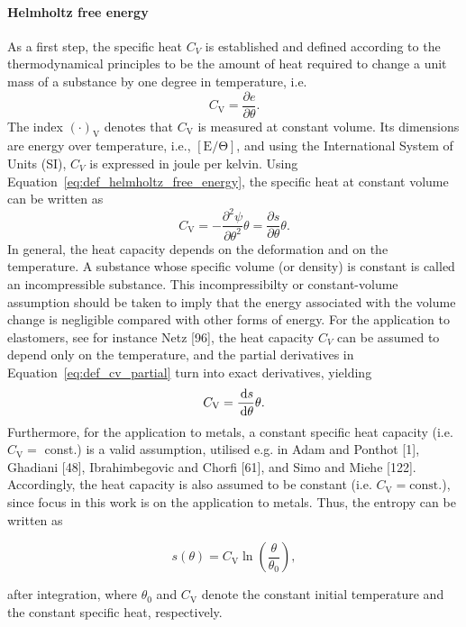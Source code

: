 \paragraph{Helmholtz free energy}
As a first step, the specific heat \(C_{V}\) is established and defined according to the thermodynamical principles to be the amount of heat required to change a unit mass of a substance by one degree in temperature, i.e.
\begin{equation}
C_{\mathrm{V}}=\frac{\partial e}{\partial \theta}.
\end{equation}
The index \((\cdot)_\mathrm{V}\) denotes that \(C_\mathrm{V}\) is measured at constant volume.
Its dimensions are energy over temperature, i.e., \(\mathrm{[E/\Theta]}\), and using the International System of Units (SI), \(C_{V}\) is expressed in joule per kelvin.
Using Equation~\ref{eq:def_helmholtz_free_energy}, the specific heat at constant volume can be written as
\begin{equation} \label{eq:def_cv_partial}
C_{\mathrm{V}}=-\frac{\partial^{2} \psi}{\partial \theta^{2}} \theta=\frac{\partial s}{\partial \theta} \theta.
\end{equation}
In general, the heat capacity depends on the deformation and on the temperature.
A substance whose specific volume (or density) is constant is called an incompressible substance.
This incompressibilty or constant-volume assumption should be taken to imply that the energy associated with the volume change is negligible compared with other forms of energy.
For the application to elastomers, see for instance Netz [96], the heat capacity \(C_{V}\) can be assumed to depend only on the temperature, and the partial derivatives in Equation~\eqref{eq:def_cv_partial} turn into exact derivatives, yielding
\begin{equation}
  C_\mathrm{V} = \frac{\,\mathrm{d} s}{\,\mathrm{d} \theta}\theta.
\end{equation}
Furthermore, for the application to metals, a constant specific heat capacity (i.e. \(C_{\mathrm{V}}=\) const.) is a valid assumption, utilised e.g. in Adam and Ponthot [1], Ghadiani [48], Ibrahimbegovic and Chorfi [61], and Simo and Miehe [122].
Accordingly, the heat capacity is also assumed to be constant (i.e. \(C_{\mathrm{V}}= \mathrm{const}\).), since focus in this work is on the application to metals.
Thus, the entropy can be written as
\begin{highlight}
\begin{equation}
s(\theta) = C_\mathrm{V}\ln\left(\frac{\theta}{\theta_0}\right),
\end{equation}
\end{highlight}
after integration, where \(\theta_{0}\) and \(C_{\mathrm{V}}\) denote the constant initial temperature and the constant specific heat, respectively.

